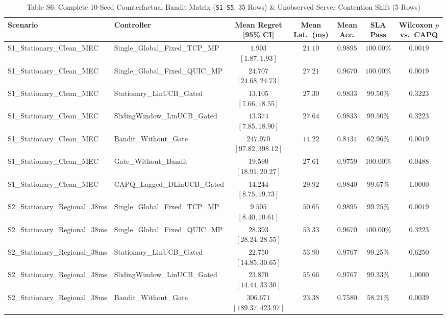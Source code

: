 \documentclass[10pt,journal,compsoc]{IEEEtran}
\begin{document}
\begin{table}[!t]
\centering
\caption{Table S6: Complete 10-Seed Counterfactual Bandit Matrix (\texttt{S1}--\texttt{S5}, 35 Rows) \& Unobserved Server Contention Shift (5 Rows)}
\setlength{\tabcolsep}{3.5pt}
\renewcommand{\arraystretch}{1.01}
\begin{adjustbox}{max width=\textwidth}
\begin{tabular}{@{}llccccc@{}}
\toprule
\textbf{Scenario} & \textbf{Controller} & \textbf{Mean Regret [95\% CI]} & \textbf{Mean Lat.\ (ms)} & \textbf{Mean Acc.} & \textbf{SLA Pass} & \textbf{Wilcoxon $p$ vs.\ CAPQ} \\
\midrule
S1\_Stationary\_Clean\_MEC & Single\_Global\_Fixed\_TCP\_MP & $1.903$ $[1.87, 1.93]$ & $21.10$ & $0.9895$ & $100.00\%$ & $0.0019$ \\
S1\_Stationary\_Clean\_MEC & Single\_Global\_Fixed\_QUIC\_MP & $24.707$ $[24.68, 24.73]$ & $27.21$ & $0.9670$ & $100.00\%$ & $0.0019$ \\
S1\_Stationary\_Clean\_MEC & Stationary\_LinUCB\_Gated & $13.105$ $[7.66, 18.55]$ & $27.30$ & $0.9833$ & $99.50\%$ & $0.3223$ \\
S1\_Stationary\_Clean\_MEC & SlidingWindow\_LinUCB\_Gated & $13.374$ $[7.85, 18.90]$ & $27.64$ & $0.9833$ & $99.50\%$ & $0.3223$ \\
S1\_Stationary\_Clean\_MEC & Bandit\_Without\_Gate & $247.970$ $[97.82, 398.12]$ & $14.22$ & $0.8134$ & $62.96\%$ & $0.0019$ \\
S1\_Stationary\_Clean\_MEC & Gate\_Without\_Bandit & $19.590$ $[18.91, 20.27]$ & $27.61$ & $0.9759$ & $100.00\%$ & $0.0488$ \\
S1\_Stationary\_Clean\_MEC & CAPQ\_Lagged\_DLinUCB\_Gated & $14.244$ $[8.75, 19.73]$ & $29.92$ & $0.9840$ & $99.67\%$ & $1.0000$ \\
S2\_Stationary\_Regional\_38ms & Single\_Global\_Fixed\_TCP\_MP & $9.505$ $[8.40, 10.61]$ & $50.65$ & $0.9895$ & $99.25\%$ & $0.0019$ \\
S2\_Stationary\_Regional\_38ms & Single\_Global\_Fixed\_QUIC\_MP & $28.393$ $[28.24, 28.55]$ & $53.33$ & $0.9670$ & $100.00\%$ & $0.3223$ \\
S2\_Stationary\_Regional\_38ms & Stationary\_LinUCB\_Gated & $22.750$ $[14.85, 30.65]$ & $53.90$ & $0.9767$ & $99.25\%$ & $0.6250$ \\
S2\_Stationary\_Regional\_38ms & SlidingWindow\_LinUCB\_Gated & $23.870$ $[14.44, 33.30]$ & $55.66$ & $0.9767$ & $99.33\%$ & $1.0000$ \\
S2\_Stationary\_Regional\_38ms & Bandit\_Without\_Gate & $306.671$ $[189.37, 423.97]$ & $23.38$ & $0.7580$ & $58.21\%$ & $0.0039$ \\

\end{tabular}
\end{adjustbox}
\end{table}
\end{document}
